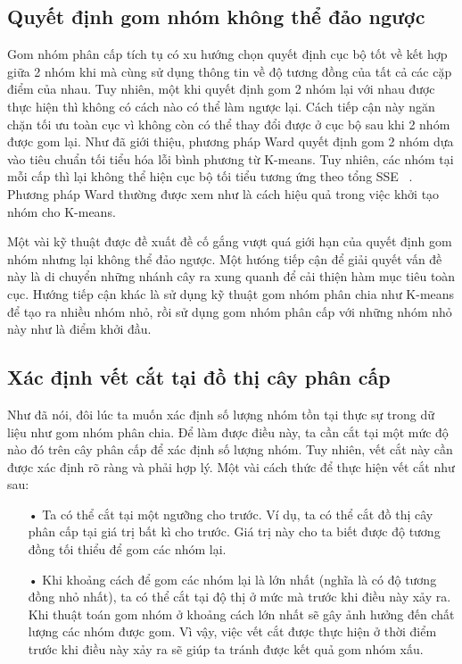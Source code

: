 \subsection{Quyết định gom nhóm không thể đảo ngược}
Gom nhóm phân cấp tích tụ có xu hướng chọn quyết định cục bộ tốt về kết hợp giữa 2 nhóm khi mà cùng sử dụng thông tin về độ tương đồng của tất cả các cặp điểm của nhau.
Tuy nhiên, một khi quyết định gom 2 nhóm lại với nhau được thực hiện thì không có cách nào có thể làm ngược lại.
Cách tiếp cận này ngăn chặn tối ưu toàn cục vì không còn có thể thay đổi được ở cục bộ sau khi 2 nhóm được gom lại.
Như đã giới thiệu, phương pháp Ward quyết định gom 2 nhóm dựa vào tiêu chuẩn tối tiểu hóa lỗi bình phương từ K-means.
Tuy nhiên, các nhóm tại mỗi cấp thì lại không thể hiện cục bộ tối tiểu tương ứng theo tổng SSE ~\cite{SSE}.
Phương pháp Ward thường được xem như là cách hiệu quả trong việc khởi tạo nhóm cho K-means.

Một vài kỹ thuật được đề xuất đề cố gắng vượt quá giới hạn của quyết định gom nhóm nhưng lại không thể đảo ngược.
Một hưóng tiếp cận để giải quyết vấn đề này là di chuyển những nhánh cây ra xung quanh để cải thiện hàm mục tiêu toàn cục.
Hướng tiếp cận khác là sử dụng kỹ thuật gom nhóm phân chia như K-means để tạo ra nhiều nhóm nhỏ, rồi sử dụng gom nhóm phân cấp với những nhóm nhỏ này như là điểm khởi đầu.

\subsection{Xác định vết cắt tại đồ thị cây phân cấp}
Như đã nói, đôi lúc ta muốn xác định số lượng nhóm tồn tại thực sự trong dữ liệu như gom nhóm phân chia.
Để làm được điều này, ta cần cắt tại một mức độ nào đó trên cây phân cấp để xác định số lượng nhóm.
Tuy nhiên, vết cắt này cần được xác định rõ ràng và phải hợp lý.
Một vài cách thức để thực hiện vết cắt như sau:
\begin{enumerate}
\item[•]Ta có thể cắt tại một ngưỡng cho trước.
Ví dụ, ta có thể cắt đồ thị cây phân cấp tại giá trị bất kì cho trước.
Giá trị này cho ta biết được độ tương đồng tối thiểu để gom các nhóm lại.
\item[•]Khi khoảng cách để gom các nhóm lại là lớn nhất (nghĩa là có độ tương đồng nhỏ nhất), ta có thể cắt tại độ thị ở mức mà trước khi điều này xảy ra.
Khi thuật toán gom nhóm ở khoảng cách lớn nhất sẽ gây ảnh hưởng đến chất lượng các nhóm được gom.
Vì vậy, việc vết cắt được thực hiện ở thời điểm trước khi điều này xảy ra sẽ giúp ta tránh được kết quả gom nhóm xấu.
\end{enumerate}

